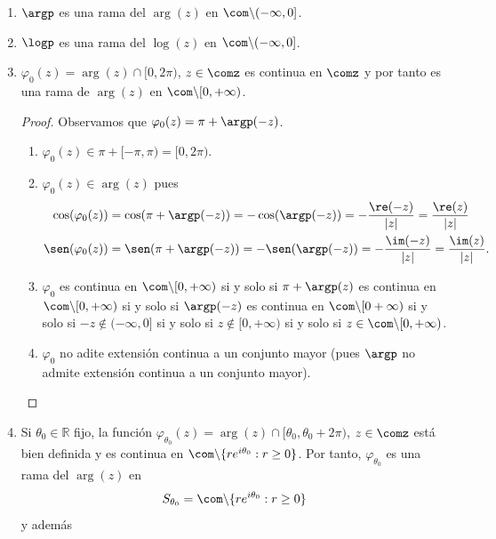 \begin{ejemplo}
\begin{enumerate}
    \item[1)] $\argp$ es una rama del $\arg(z)$ en $\com \backslash (-\infty,0]$.
    \item[2)] $\logp$ es una rama del $\log(z)$ en $\com \backslash (-\infty,0]$.
    \item[3)] $\varphi_0(z) = \arg(z) \cap [0,2\pi)$, $z \in \comz$ es continua en $\comz$ y por tanto es una rama de $\arg(z)$ en $\com \backslash [0,+\infty)$.
    \begin{proof}
    Observamos que $\varphi_0(z) = \pi + \argp(-z)$.
    \begin{enumerate}
        \item[(i)] $\varphi_0(z) \in \pi + [-\pi,\pi) = [0,2\pi)$.
        \item[(ii)] $\varphi_0(z) \in \arg(z)$ pues
        \begin{align*}
            \cos(\varphi_0(z)) &= \cos(\pi + \argp(-z)) = -\cos(\argp(-z)) = -\frac{\re(-z)}{|z|} = \frac{\re(z)}{|z|} \\
            \sen(\varphi_0(z)) &= \sen(\pi + \argp(-z)) = -\sen(\argp(-z)) = -\frac{\im(-z)}{|z|} = \frac{\im(z)}{|z|}.
        \end{align*}
        \item[(iii)] $\varphi_0$ es continua en $\com \backslash [0,+\infty)$ si y solo si $\pi + \argp(z)$ es continua en $\com \backslash [0,+\infty)$ si y solo si $\argp(-z)$ es continua en $\com \backslash [0+\infty)$ si y solo si $-z \not \in (-\infty,0]$ si y solo si $z \not \in [0,+\infty)$ si y solo si $z \in \com \backslash [0,+\infty)$.
        \item[(iv)] $\varphi_0$ no adite extensión continua a un conjunto mayor (pues $\argp$ no admite extensión continua a un conjunto mayor).
    \end{enumerate}
    \end{proof}
    \item[4)] Si $\theta_0 \in \mathbb{R}$ fijo, la función $\varphi_{\theta_0}(z) = \arg(z) \cap [\theta_0, \theta_0 + 2\pi)$, $z \in \comz$ está bien definida y es continua en $\com \backslash \{re^{i\theta_0} : r \ge 0 \}$. Por tanto, $\varphi_{\theta_0}$ es una rama del $\arg(z)$ en 
    \begin{align*}
        S_{\theta_0} = \com \backslash \{ re^{i\theta_0} : r \ge 0 \}
    \end{align*}
    y además
    \begin{align*}

\end{align*}
\end{enumerate}
\end{ejemplo}
